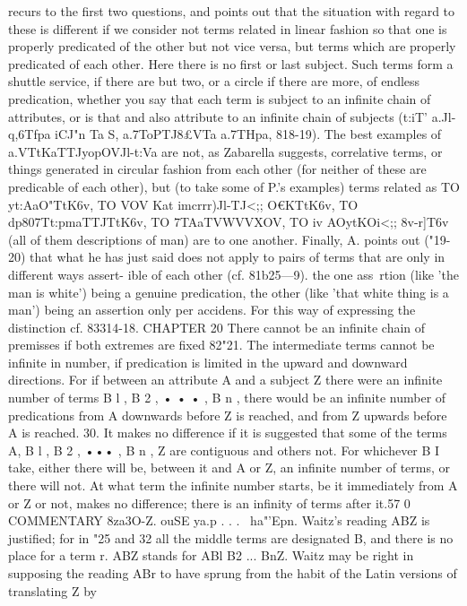 {{{{{{{{{{{{{{{{{recurs to the first two questions, and points out that the situation
with regard to these is different if we consider not terms related
in linear fashion so that one is properly predicated of the other
but not vice versa, but terms which are properly predicated of
each other. Here there is no first or last subject. Such terms
form a shuttle service, if there are but two, or a circle if there are
more, of endless predication, whether you say that each term is
subject to an infinite chain of attributes, or is that and also
attribute to an infinite chain of subjects (t:iT' a.Jl-q,6Tfpa iCJ"n Ta
S,
a.7ToPTJ8£VTa a.7THpa, 818-19).
The best examples of a.VTtKaTTJyopOVJl-t:Va are not, as Zabarella
suggests, correlative terms, or things generated in circular
fashion from each other (for neither of these are predicable of
each other), but (to take some of P.'s examples) terms related as
TO yt:AaO"TtK6v, TO VOV Kat imcrrr)Jl-TJ<;; O€KTtK6v, TO dp807Tt:pmaTTJTtK6v,
TO 7TAaTVWVVXOV, TO iv AOytKOi<;; 8v-r]T6v (all of them descriptions
of man) are to one another.
Finally, A. points out ("19-20) that what he has just said does
not apply to pairs of terms that are only in different ways assert-
ible of each other (cf. 81b25---9). the one ass~rtion (like 'the man
is white') being a genuine predication, the other (like 'that white
thing is a man') being an assertion only per accidens. For this
way of expressing the distinction cf. 83314-18.
CHAPTER 20
There cannot be an infinite chain of premisses if both extremes
are fixed
82"21. The intermediate terms cannot be infinite in number,
if predication is limited in the upward and downward directions.
For if between an attribute A and a subject Z there were an
infinite number of terms B l , B 2 , • • • , B n , there would be an
infinite number of predications from A downwards before Z is
reached, and from Z upwards before A is reached.
30. It makes no difference if it is suggested that some of the
terms A, B l , B 2 , ••• , B n , Z are contiguous and others not. For
whichever B I take, either there will be, between it and A or Z,
an infinite number of terms, or there will not. At what term the
infinite number starts, be it immediately from A or Z or not,
makes no difference; there is an infinity of terms after it.57 0
COMMENTARY
8za3O-Z. ouSE ya.p . . . ~ha"'Epn. Waitz's reading ABZ is
justified; for in "25 and 32 all the middle terms are designated B,
and there is no place for a term r. ABZ stands for ABl B2 ...
BnZ. Waitz may be right in supposing the reading ABr to have
sprung from the habit of the Latin versions of translating Z by
}}}}}}}}}}}}}}}}}
